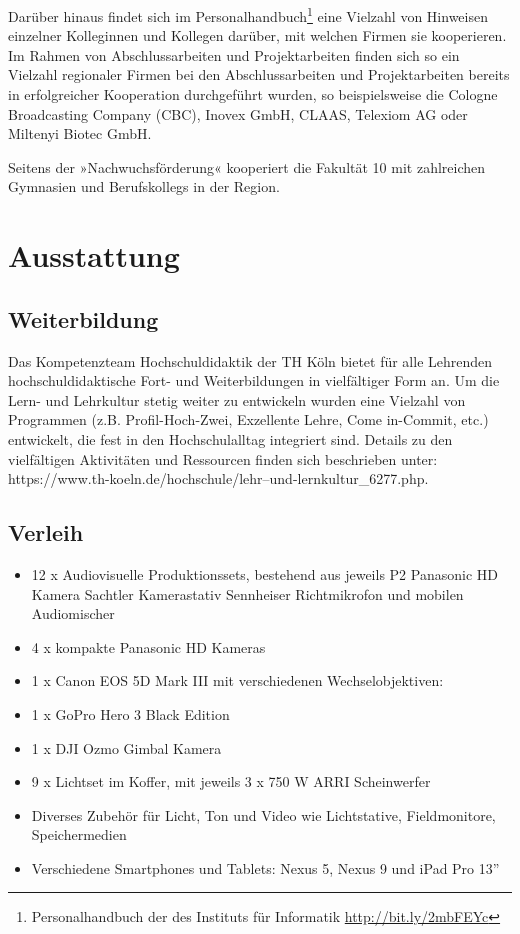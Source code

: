 Darüber hinaus findet sich im Personalhandbuch\footnote{Personalhandbuch
  der des Instituts für Informatik
  \href{http://bit.ly/2mpcbWN}{http://bit.ly/2mbFEYc}} eine Vielzahl von
Hinweisen einzelner Kolleginnen und Kollegen darüber, mit welchen Firmen
sie kooperieren. Im Rahmen von Abschlussarbeiten und Projektarbeiten
finden sich so ein Vielzahl regionaler Firmen bei den Abschlussarbeiten
und Projektarbeiten bereits in erfolgreicher Kooperation durchgeführt
wurden, so beispielsweise die Cologne Broadcasting Company (CBC), Inovex
GmbH, CLAAS, Telexiom AG oder Miltenyi Biotec GmbH.

Seitens der »Nachwuchsförderung« kooperiert die Fakultät 10 mit
zahlreichen Gymnasien und Berufskollegs in der Region.

\chapter{Ausstattung}\label{ausstattung}

\section{Weiterbildung}\label{weiterbildung}

Das Kompetenzteam Hochschuldidaktik der TH Köln bietet für alle
Lehrenden hochschuldidaktische Fort- und Weiterbildungen in vielfältiger
Form an. Um die Lern- und Lehrkultur stetig weiter zu entwickeln wurden
eine Vielzahl von Programmen (z.B. Profil-Hoch-Zwei, Exzellente Lehre,
Come in-Commit, etc.) entwickelt, die fest in den Hochschulalltag
integriert sind. Details zu den vielfältigen Aktivitäten und Ressourcen
finden sich beschrieben unter:
https://www.th-koeln.de/hochschule/lehr--und-lernkultur\_6277.php.

\section{Verleih}\label{verleih}

\begin{itemize}
\tightlist
\item
  12 x Audiovisuelle Produktionssets, bestehend aus jeweils P2 Panasonic
  HD Kamera Sachtler Kamerastativ Sennheiser Richtmikrofon und mobilen
  Audiomischer
\item
  4 x kompakte Panasonic HD Kameras
\item
  1 x Canon EOS 5D Mark III mit verschiedenen Wechselobjektiven:
\item
  1 x GoPro Hero 3 Black Edition
\item
  1 x DJI Ozmo Gimbal Kamera
\item
  9 x Lichtset im Koffer, mit jeweils 3 x 750 W ARRI Scheinwerfer
\item
  Diverses Zubehör für Licht, Ton und Video wie Lichtstative,
  Fieldmonitore, Speichermedien
\item
  Verschiedene Smartphones und Tablets: Nexus 5, Nexus 9 und iPad Pro
  13''
\end{itemize}


